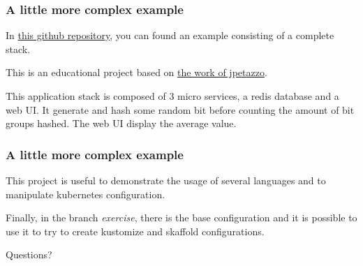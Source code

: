 	\begin{frame}
		\frametitle{A little more complex example}
		
		In \href{https://github.com/Tinkou/kubercoins}{this github repository}, you can found an example consisting of a complete stack.
		
		\bigskip
		
		This is an educational project based on \href{https://github.com/jpetazzo/dockercoins}{the work of jpetazzo}.
		
		\medskip
		
		This application stack is composed of 3 micro services, a redis database and a web UI. It generate and hash some random bit before counting the amount of bit groups hashed. The web UI display the average value.
		
	\end{frame}
	
	\begin{frame}
		\frametitle{A little more complex example}
		
		This project is useful to demonstrate the usage of several languages and to manipulate kubernetes configuration.
		
		\medskip
		
		Finally, in the branch \textit{exercise}, there is the base configuration and it is possible to use it to try to create kustomize and skaffold configurations.
	\end{frame}
	
	\begin{frame}
		\begin{center}
			Questions?
		\end{center}
	\end{frame}
